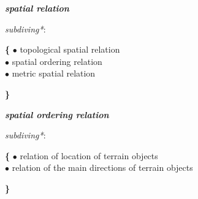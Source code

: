\documentclass{article}
\begin{document}
\begin{multicols}{2}
    \noindent \textit{\textbf{spatial relation}}
    \vspace{-0.3cm}
    \begin{description}[leftmargin=!, labelwidth=1cm, itemsep=-1.5mm]
    \item[$\coloneqq$] [class of relations that define the semantic properties of a terrain object in relation to other terrain objects]
        \item[$\Rightarrow$] \textit{subdiving*}: \\
        \vspace{-0.3cm}
        \item[]
        \begin{description}[leftmargin=*]
            \begin{itemize}[leftmargin=*]
                \hspace{-3mm} \textbf{\{} \hspace{-2.5mm} $\bullet$ \hspace{4.7mm} topological spatial relation \\
                $\bullet$ \hspace{0.5cm} spatial ordering relation \\
                $\bullet$ \hspace{5mm} metric spatial relation \par 
                \hspace{-3mm} \textbf{\}} \\
            \end{itemize}
        \end{description}
    \end{description}

    \noindent \textit{\textbf{spatial ordering relation}}
    \vspace{-0.3cm}
    \begin{description}[leftmargin=!, labelwidth=1cm, itemsep=-1.5mm]
        \item[$\Rightarrow$] \textit{subdiving*}: \\
        \vspace{-0.3cm}
        \item[]
        \begin{description}[leftmargin=*]
            \begin{itemize}[leftmargin=*]
                \hspace{-3mm} \textbf{\{} \hspace{-2.5mm} $\bullet$ \hspace{4.7mm} relation of location of terrain objects \\
                $\bullet$ \hspace{0.5cm} relation of the main directions of terrain objects \par
                \hspace{-3mm} \textbf{\}}
            \end{itemize}
        \end{description}
    \end{description}


\end{multicols}
\end{document}
